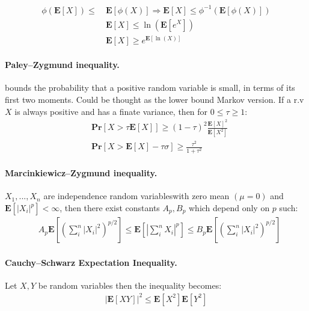\documentclass{article}
\newcommand{\prb}[1]{ \mathbf{Pr} \left[ {#1} \right]}
\newcommand{\expp}[1]{ \mathbf{E} \left[ {#1} \right]}
\newcommand{\indpr}{$ X_1, ..., X_n$ are independence random variables}
\begin{document}
\begin{multicols*}{2}
  \begin{equation*}
    \begin{split}
      \phi\left( \expp{X} \right) \le \ & \expp{\phi\left( X \right)} \Rightarrow   \expp{X} \le \phi^{-1} \left( \expp{\phi\left( X \right)} \right) \\
      & \expp{X} \le \ln\left(\expp{e^{X}}  \right)  \\ 
      &  \expp{X} \ge e^{\expp{\ln \left( X \right)}}  
    \end{split}
  \end{equation*}
  \paragraph{Paley–Zygmund inequality.} bounds the probability that a positive random variable is small, in terms of its first two moments. Could be thought as the lower bound Markov version. If a r.v $X$ is always positive and has a finate variance, then for $0 \le \tau \ge 1$:  
  \begin{equation*}
    \begin{split}
      & \prb{ X > \tau \expp{X} } \ge \left( 1 - \tau \right)^{2}\frac{\expp{X}^{2}}{\expp{X^2}}\\
      &  \prb{ X > \expp{X} - \tau \sigma } \ge \frac{\tau^{2}}{1+\tau^{2}} 
    \end{split}
  \end{equation*}
  \paragraph{Marcinkiewicz–Zygmund inequality.} \indpr with zero mean $\left( \mu = 0  \right)$ and $\expp{|X_{i}|^{p}} < \infty$, then there exist constants $A_{p}, B_{p}$ which depend only on $p$ such:  
  \begin{equation*}
    \begin{split}
      & A_{p}\expp{\left( \sum_{i}^{n}{|X_{i}|^{2}} \right)^{p/2}  } \le \expp{|\sum_{i}^{n}{X_{i}}|^{p} }\le B_{p}\expp{\left( \sum_{i}^{n}{|X_{i}|^{2}} \right)^{p/2}  }        
    \end{split}
  \end{equation*}
  \paragraph{Cauchy–Schwarz Expectation Inequality.} Let $X,Y$ be random variables then the inequality becomes: 
  \begin{equation*}
    \begin{split}
      |\expp{ XY} |^{2}\le\expp{X^{2}}\expp{Y^{2}}
    \end{split}
  \end{equation*}

\end{multicols*}
\end{document}
